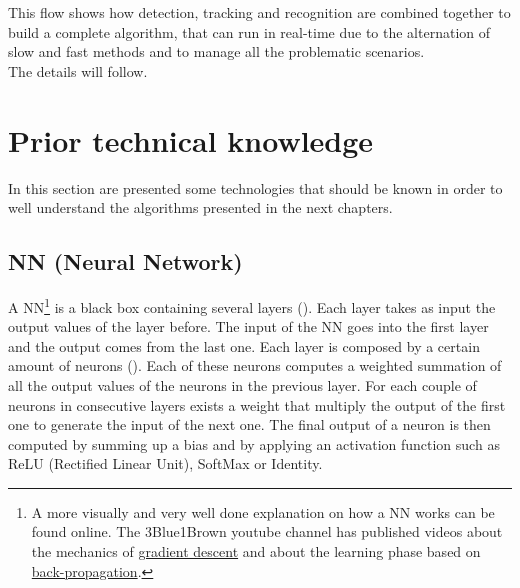 This flow shows how detection, tracking and recognition are combined together to build a complete algorithm, that can run in real-time due to the alternation of slow and fast methods and to manage all the problematic scenarios.\\
The details will follow.


\section{Prior technical knowledge}
In this section are presented some technologies that should be known in order to well understand the algorithms presented in the next chapters.

\subsection{NN (Neural Network)} \label{sec:nn}
A NN\footnote{A more visually and very well done explanation on how a NN works can be found online. The 3Blue1Brown youtube channel has published videos about  the mechanics of \href{https://www.youtube.com/watch?v=IHZwWFHWa-w}{gradient descent} and about the learning phase based on \href{https://www.youtube.com/watch?v=Ilg3gGewQ5U}{back-propagation}.} is a black box containing several layers (). Each layer takes as input the output values of the layer before. The input of the NN goes into the first layer and the output comes from the last one. Each layer is composed by a certain amount of neurons (). Each of these neurons computes a weighted summation of all the output values of the neurons in the previous layer. For each couple of neurons in consecutive layers exists a weight that multiply the output of the first one to generate the input of the next one. The final output of a neuron is then computed by summing up a bias and by applying an activation function such as ReLU (Rectified Linear Unit), SoftMax or Identity.\\

